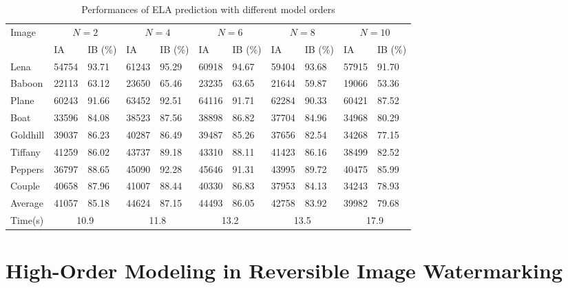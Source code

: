 \documentclass[journal]{IEEEtran}
\begin{document}
\begin{table*}[t]
    \caption{\label{tbl:elap}Performances of ELA prediction with different model orders}
    \centering
    \begin{tabular}{lllllllllll}\hline\hline
	Image & \multicolumn{2}{c}{$N=2$} & \multicolumn{2}{c}{$N=4$} & \multicolumn{2}{c}{$N=6$} & \multicolumn{2}{c}{$N=8$} & \multicolumn{2}{c}{$N=10$}	\\\cline{2-11}
		& IA & IB (\%)	& IA & IB (\%)	& IA & IB (\%)	& IA & IB (\%)	& IA & IB (\%) \\\hline
	Lena 	& 54754 & 93.71 & 61243 & 95.29 & 60918 & 94.67 & 59404 & 93.68 & 57915 & 91.70 \\
	Baboon  & 22113 & 63.12 & 23650 & 65.46 & 23235 & 63.65 & 21644 & 59.87 & 19066 & 53.36 \\
	Plane	& 60243 & 91.66 & 63452 & 92.51 & 64116 & 91.71 & 62284 & 90.33 & 60421 & 87.52 \\
	Boat	& 33596 & 84.08 & 38523 & 87.56 & 38898 & 86.82 & 37704 & 84.96 & 34968 & 80.29 \\
	Goldhill& 39037 & 86.23 & 40287 & 86.49 & 39487 & 85.26 & 37656 & 82.54 & 34268 & 77.15 \\
	Tiffany & 41259 & 86.02 & 43737 & 89.18 & 43310 & 88.11 & 41423 & 86.16 & 38499 & 82.52 \\
	Peppers	& 36797 & 88.65 & 45090 & 92.28 & 45646 & 91.31 & 43995 & 89.72 & 40475 & 85.99 \\
	Couple	& 40658 & 87.96 & 41007 & 88.44 & 40330 & 86.83 & 37953 & 84.13 & 34243 & 78.93 \\
	Average	& 41057 & 85.18 & 44624 & 87.15 & 44493 & 86.05 & 42758 & 83.92 & 39982 & 79.68 \\
	Time(s) & \multicolumn{2}{c}{10.9} & \multicolumn{2}{c}{11.8} & \multicolumn{2}{c}{13.2} & \multicolumn{2}{c}{13.5} & \multicolumn{2}{c}{17.9}	\\\hline\hline
    \end{tabular}
\end{table*}

\section{High-Order Modeling in Reversible Image Watermarking}\label{sec:high}
\end{document}
